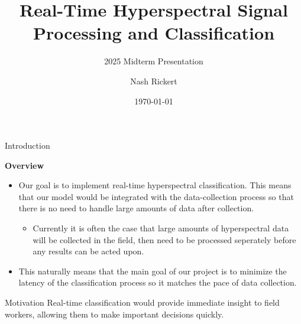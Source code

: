 \documentclass[aspectratio=169,xcolor=dvipsnames]{beamer}
\title{Real-Time Hyperspectral Signal Processing and Classification}
\subtitle{2025 Midterm Presentation}
\author{Nash Rickert}
\institute
{
    Electrical and Computer Engineering Department, REU \\
    Montana State University %
}
\date{\today} %
\newcommand\myheading[1]{%
  \par\bigskip
  {\Large\bfseries#1}\par\smallskip}
\begin{document}
\begin{frame}
    \titlepage
\end{frame}


\begin{frame}{Introduction}
    \myheading{Overview}
    \begin{itemize}
        \item Our goal is to implement real-time hyperspectral classification. This means that our model would be integrated with the data-collection process so that there is no need to handle large amounts of data after collection.
        \begin{itemize}
            \item Currently it is often the case that large amounts of hyperspectral data will be collected in the field, then need to be processed seperately before any results can be acted upon.
        \end{itemize}
        \item This naturally means that the main goal of our project is to minimize the latency of the classification process so it matches the pace of data collection.
    \end{itemize}

    \begin{block}{Motivation}
        Real-time classification would provide immediate insight to field workers, allowing them to make important decisions quickly.
    \end{block}
\end{frame}
\end{document}
